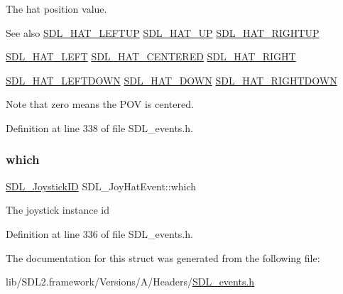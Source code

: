 The hat position value. \begin{DoxySeeAlso}{See also}
\mbox{\hyperlink{_s_d_l__joystick_8h_a6d7988b43c09ced08ec318a2556f1858}{S\+D\+L\+\_\+\+H\+A\+T\+\_\+\+L\+E\+F\+T\+UP}} \mbox{\hyperlink{_s_d_l__joystick_8h_ac916fe96c0740790e5496e12c67d8889}{S\+D\+L\+\_\+\+H\+A\+T\+\_\+\+UP}} \mbox{\hyperlink{_s_d_l__joystick_8h_a65fde978b4ab9c269c215d1922ae7755}{S\+D\+L\+\_\+\+H\+A\+T\+\_\+\+R\+I\+G\+H\+T\+UP}} 

\mbox{\hyperlink{_s_d_l__joystick_8h_a4666c12cae25d8bab053d8569396cd77}{S\+D\+L\+\_\+\+H\+A\+T\+\_\+\+L\+E\+FT}} \mbox{\hyperlink{_s_d_l__joystick_8h_adbfd6f0bad25cd1bb79f8c0a065f3833}{S\+D\+L\+\_\+\+H\+A\+T\+\_\+\+C\+E\+N\+T\+E\+R\+ED}} \mbox{\hyperlink{_s_d_l__joystick_8h_a5d1844afaf2ceaf58c689a8bd480a543}{S\+D\+L\+\_\+\+H\+A\+T\+\_\+\+R\+I\+G\+HT}} 

\mbox{\hyperlink{_s_d_l__joystick_8h_a3fa8609d382a0f74507890491033c784}{S\+D\+L\+\_\+\+H\+A\+T\+\_\+\+L\+E\+F\+T\+D\+O\+WN}} \mbox{\hyperlink{_s_d_l__joystick_8h_aa87f7a91d6bae8b420b133559d983338}{S\+D\+L\+\_\+\+H\+A\+T\+\_\+\+D\+O\+WN}} \mbox{\hyperlink{_s_d_l__joystick_8h_abf50339da11ca12699ee2199607d275f}{S\+D\+L\+\_\+\+H\+A\+T\+\_\+\+R\+I\+G\+H\+T\+D\+O\+WN}}
\end{DoxySeeAlso}
Note that zero means the P\+OV is centered. 

Definition at line 338 of file S\+D\+L\+\_\+events.\+h.

\mbox{\label{struct_s_d_l___joy_hat_event_ac9d9bb179f9116d16b3da47cacd74b55}} 
\subsubsection{\texorpdfstring{which}{which}}
{\footnotesize\ttfamily \mbox{\hyperlink{_s_d_l__joystick_8h_a3c3d32500cb08f76ee8077983912c0bd}{S\+D\+L\+\_\+\+Joystick\+ID}} S\+D\+L\+\_\+\+Joy\+Hat\+Event\+::which}

The joystick instance id 

Definition at line 336 of file S\+D\+L\+\_\+events.\+h.



The documentation for this struct was generated from the following file\+:\begin{DoxyCompactItemize}
\item 
lib/\+S\+D\+L2.\+framework/\+Versions/\+A/\+Headers/\mbox{\hyperlink{_s_d_l__events_8h}{S\+D\+L\+\_\+events.\+h}}\end{DoxyCompactItemize}
